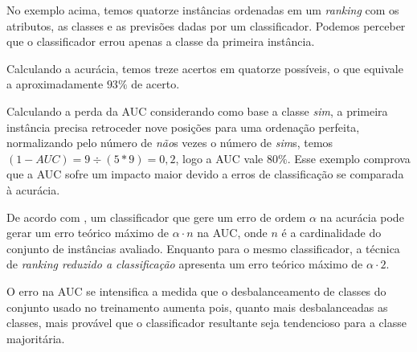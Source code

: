 No exemplo acima, temos quatorze instâncias ordenadas em um \emph{ranking} com os atributos, as classes e as previsões dadas por um classificador. Podemos perceber que o classificador errou apenas a classe da primeira instância.

Calculando a acurácia, temos treze acertos em quatorze possíveis, o que equivale a aproximadamente $93\%$ de acerto.

Calculando a perda da AUC considerando como base a classe \emph{sim}, a primeira instância precisa retroceder nove posições para uma ordenação perfeita, normalizando pelo número de \emph{não}s vezes o número de \emph{sim}s, temos $(1 - AUC) = 9 \div (5 * 9) = 0,2$, logo a AUC vale $80\%$. Esse exemplo comprova que a AUC sofre um impacto maior devido a erros de classificação se comparada à acurácia.

De acordo com \cite{langford08}, um classificador que gere um erro de ordem $\alpha$ na acurácia pode gerar um erro teórico máximo de $\alpha \cdot n$ na AUC, onde $n$ é a cardinalidade do conjunto de instâncias avaliado. Enquanto para o mesmo classificador, a técnica de \emph{ranking reduzido a classificação} apresenta um erro teórico máximo de $\alpha \cdot 2$.

O erro na AUC se intensifica a medida que o desbalanceamento de classes do conjunto usado no treinamento aumenta pois, quanto mais desbalanceadas as classes, mais provável que o classificador resultante seja tendencioso para a classe majoritária.
